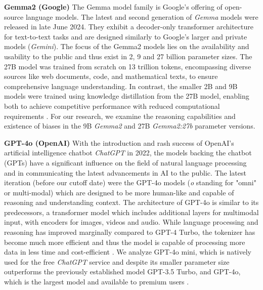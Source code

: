 \par \textbf{Gemma2 (Google)} The Gemma model family is Google's offering of open-source language models. The latest and second generation of \textit{Gemma} models were released in late June 2024. They exhibit a decoder-only transformer architecture for text-to-text tasks and are designed similarly to Google's larger and private models (\textit{Gemini}). The focus of the Gemma2 models lies on the availability and usability to the public and thus exist in 2, 9 and 27 billion parameter sizes. The 27B model was trained from scratch on 13 trillion tokens, encompassing diverse sources like web documents, code, and mathematical texts, to ensure comprehensive language understanding. In contrast, the smaller 2B and 9B models were trained using knowledge distillation from the 27B model, enabling both to achieve competitive performance with reduced computational requirements \parencite{team2024gemma}. For our research, we examine the reasoning capabilities and existence of biases in the 9B \textit{Gemma2} and 27B \textit{Gemma2:27b} parameter versions.

\par \textbf{GPT-4o (OpenAI)} With the introduction and rash success of OpenAI's artificial intelligence chatbot \textit{ChatGPT} in 2022, the models backing the chatbot (GPTs) have a significant influence on the field of natural language processing and in communicating the latest advancements in AI to the public. The latest iteration (before our cutoff date) were the GPT-4o models (\textit{o} standing for "omni" or multi-modal) which are designed to be more human-like and capable of reasoning and understanding context. The architecture of GPT-4o is similar to its predecessors, a transformer model which includes additional layers for multimodal input, with encoders for images, videos and audio. While language processing and reasoning has improved marginally compared to GPT-4 Turbo, the tokenizer has become much more efficient and thus the model is capable of processing more data in less time and cost-efficient \parencite{achiam2023gpt, openai2024gpt4o}. We analyze GPT-4o mini, which is natively used for the free \textit{ChatGPT} service and despite its smaller parameter size outperforms the previously established model GPT-3.5 Turbo, and GPT-4o, which is the largest model and available to premium users \parencite{openai2024gpt4omini}.

